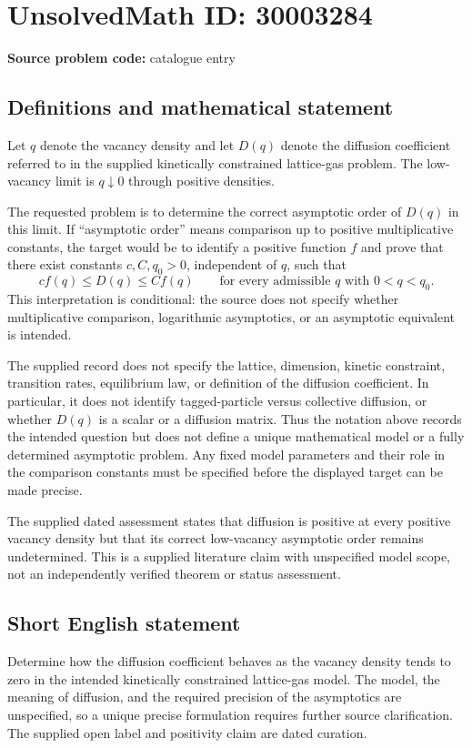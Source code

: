 \documentclass[11pt]{article}
\begin{document}
\section*{UnsolvedMath ID: 30003284}
\textbf{Source problem code:} catalogue entry
\subsection{Definitions and mathematical statement}
Let \(q\) denote the vacancy density and let \(D(q)\) denote the diffusion coefficient referred to in the supplied kinetically constrained lattice-gas problem. The low-vacancy limit is \(q\downarrow0\) through positive densities.

The requested problem is to determine the correct asymptotic order of \(D(q)\) in this limit. If ``asymptotic order'' means comparison up to positive multiplicative constants, the target would be to identify a positive function \(f\) and prove that there exist constants \(c,C,q_0>0\), independent of \(q\), such that
\[
 c f(q)\leq D(q)\leq C f(q)
 \qquad\text{for every admissible }q\text{ with }0<q<q_0.
\]
This interpretation is conditional: the source does not specify whether multiplicative comparison, logarithmic asymptotics, or an asymptotic equivalent is intended.

The supplied record does not specify the lattice, dimension, kinetic constraint, transition rates, equilibrium law, or definition of the diffusion coefficient. In particular, it does not identify tagged-particle versus collective diffusion, or whether \(D(q)\) is a scalar or a diffusion matrix. Thus the notation above records the intended question but does not define a unique mathematical model or a fully determined asymptotic problem. Any fixed model parameters and their role in the comparison constants must be specified before the displayed target can be made precise.

The supplied dated assessment states that diffusion is positive at every positive vacancy density but that its correct low-vacancy asymptotic order remains undetermined. This is a supplied literature claim with unspecified model scope, not an independently verified theorem or status assessment.
\subsection{Short English statement}
Determine how the diffusion coefficient behaves as the vacancy density tends to zero in the intended kinetically constrained lattice-gas model. The model, the meaning of diffusion, and the required precision of the asymptotics are unspecified, so a unique precise formulation requires further source clarification. The supplied open label and positivity claim are dated curation.
\end{document}
